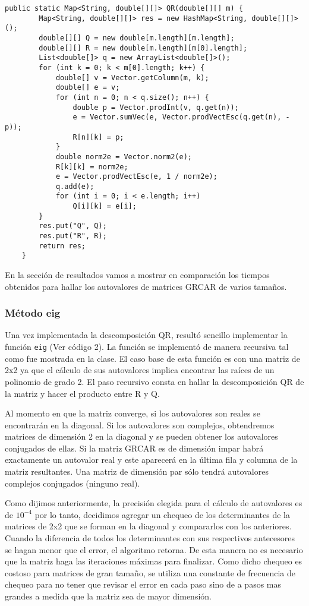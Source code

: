 \documentclass[a4paper,10pt]{article}
\begin{document}
\begin{lstlisting}[caption = Implementación de la descomposición QR en Java]
	public static Map<String, double[][]> QR(double[][] m) {
		Map<String, double[][]> res = new HashMap<String, double[][]>();
		double[][] Q = new double[m.length][m.length];
		double[][] R = new double[m.length][m[0].length];
		List<double[]> q = new ArrayList<double[]>();
		for (int k = 0; k < m[0].length; k++) {
			double[] v = Vector.getColumn(m, k);
			double[] e = v;
			for (int n = 0; n < q.size(); n++) {
				double p = Vector.prodInt(v, q.get(n));
				e = Vector.sumVec(e, Vector.prodVectEsc(q.get(n), -p));
				R[n][k] = p;
			}
			double norm2e = Vector.norm2(e);
			R[k][k] = norm2e;
			e = Vector.prodVectEsc(e, 1 / norm2e);
			q.add(e);
			for (int i = 0; i < e.length; i++)
				Q[i][k] = e[i];
		}
		res.put("Q", Q);
		res.put("R", R);
		return res;
	}
\end{lstlisting}

En la sección de resultados vamos a mostrar en comparación los tiempos obtenidos para hallar los autovalores de matrices GRCAR de varios tamaños.

\subsubsection{Método eig}

Una vez implementada la descomposición QR, resultó sencillo implementar la función \texttt{eig} (Ver código 2). La función se implementó de manera recursiva tal como fue mostrada en la clase. El caso base de esta función es 
con una matriz de 2x2 ya que el cálculo de sus autovalores implica encontrar las raíces de un polinomio de grado 2. El paso recursivo consta en hallar la descomposición QR de la matriz  y hacer el producto entre R y Q.

Al momento en que la matriz converge, si los autovalores son reales se encontrarán en la diagonal. Si los autovalores son complejos, obtendremos matrices de dimensión 2 en la diagonal y se pueden obtener los autovalores conjugados de ellas. Si la matriz GRCAR es de dimensión impar habrá exactamente un autovalor real y este aparecerá en la última fila y columna de la matriz resultantes. Una matriz de dimensión par sólo tendrá autovalores complejos conjugados (ninguno real).

Como dijimos anteriormente, la precisión elegida para el cálculo de autovalores es de $10^{-4}$ por lo tanto, decidimos agregar un chequeo de los determinantes de la matrices de 2x2 que se forman en la diagonal y compararlos con los anteriores. Cuando la diferencia de todos los determinantes con sus respectivos antecesores se hagan menor que el error, el algoritmo retorna. De esta manera no es necesario que la matriz haga las iteraciones máximas para finalizar. Como dicho chequeo es costoso para matrices de gran tamaño, se utiliza una constante de frecuencia de chequeo para no tener que revisar el error en cada paso sino de a pasos mas grandes a medida que la matriz sea de mayor dimensión.
\end{document}
